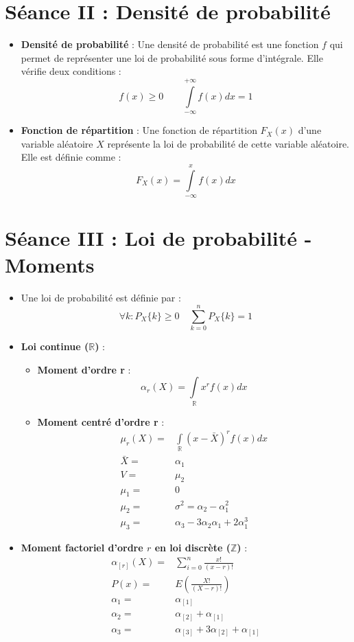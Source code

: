 \documentclass[a4paper,11pt]{report}
\begin{document}
\section{Séance II : Densité de probabilité}
\begin{itemize}
	\item \textbf{Densité de probabilité} : Une densité de probabilité est une fonction $f$ qui permet de représenter une loi de probabilité sous forme d'intégrale. Elle vérifie deux conditions :
		\[
			f(x) \ge 0 \quad \quad
			\int\limits_{-\infty}^{+\infty}{f(x)dx}=1
		\]
	\item \textbf{Fonction de répartition} : Une fonction de répartition $F_X(x)$ d'une variable aléatoire $X$ représente la loi de probabilité de cette variable aléatoire. Elle est définie comme :
		\[
			F_X(x)=\int\limits_{-\infty}^{x}{f(x)dx}
		\]
\end{itemize}

\section{Séance III : Loi de probabilité - Moments}
\begin{itemize}
	\item Une loi de probabilité est définie par :
		\[
			\forall k : P_X\{k\} \ge 0 \quad
			\sum\limits_{k=0}^{n}{P_X\{k\}} = 1
		\]
	\item \textbf{Loi continue ($\mathbb{R}$)} :
	\begin{itemize}
		\item \textbf{Moment d'ordre r} :
			\[
				\alpha_r(X) = \int\limits_{\mathbb{R}}{x^rf(x)dx}
			\]
		\item \textbf{Moment centré d'ordre r} :
			\begin{align*}
				\mu_r(X) =& \int\limits_{\mathbb{R}}{\left(x-\bar{X}\right)^rf(x)dx} \\
				\bar{X} =& \alpha_1 \\
				V=&\mu_2 \\
				\mu_1 =& 0 \\
				\mu_2 =& \sigma^2 = \alpha_2 - \alpha_1^2 \\
				\mu_3 =& \alpha_3 - 3\alpha_2 \alpha_1 + 2\alpha_1^3
			\end{align*}
	\end{itemize}
	\item \textbf{Moment factoriel d'ordre $r$ en loi discrète ($\mathbb{Z}$)} :
		\begin{align*}
			\alpha_{[r]}(X) =& \sum\limits_{i = 0}^{n}{\frac{x!}{(x-r)!}} \\
			P(x) =& E\left(\frac{X!}{(X-r)!}\right) \\
			\alpha_1 =& \alpha_{[1]} \\
			\alpha_2 =& \alpha_{[2]} + \alpha_{[1]} \\
			\alpha_3 =& \alpha_{[3]} + 3\alpha_{[2]} + \alpha_{[1]}
		\end{align*}
\end{itemize}
\end{document}
